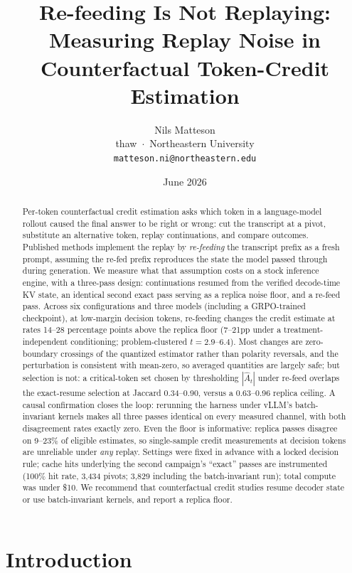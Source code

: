 \documentclass[11pt]{article}
\title{Re-feeding Is Not Replaying:\\
Measuring Replay Noise in\\
Counterfactual Token-Credit Estimation}
\author{
  Nils Matteson\\
  thaw \,$\cdot$\, Northeastern University\\
  \texttt{matteson.ni@northeastern.edu}
}
\date{June 2026}
\newcommand{\At}{\ensuremath{\hat{A}_t}\xspace}
\begin{document}
\maketitle

\begin{abstract}
Per-token counterfactual credit estimation asks which token in a language-model
rollout caused the final answer to be right or wrong: cut the transcript at a
pivot, substitute an alternative token, replay continuations, and compare
outcomes. Published methods implement the replay by \emph{re-feeding} the
transcript prefix as a fresh prompt, assuming the re-fed prefix reproduces the
state the model passed through during generation. We measure what that
assumption costs on a stock inference engine, with a three-pass design:
continuations resumed from the verified decode-time KV state, an identical
second exact pass serving as a replica noise floor, and a re-feed pass.
Across six configurations and three models (including a GRPO-trained
checkpoint), at low-margin decision tokens, re-feeding changes the credit
estimate at rates 14--28 percentage points above the replica floor
(7--21pp under a treatment-independent conditioning; problem-clustered
$t = 2.9$--$6.4$). Most changes are zero-boundary
crossings of the quantized estimator rather than polarity reversals, and the
perturbation is consistent with mean-zero, so averaged quantities are
largely safe; but
selection is not: a critical-token set chosen by thresholding $|\At|$ under
re-feed overlaps the exact-resume selection at Jaccard 0.34--0.90, versus a
0.63--0.96 replica ceiling. A causal confirmation closes the loop: rerunning
the harness under vLLM's batch-invariant kernels makes all three passes
identical on every measured channel, with both disagreement rates exactly
zero. Even the floor
is informative: replica passes disagree on 9--23\% of eligible estimates,
so single-sample credit measurements at decision tokens are unreliable under
\emph{any} replay. Settings were fixed in advance with a locked decision
rule; cache hits underlying the second campaign's ``exact'' passes are
instrumented (100\% hit
rate, 3{,}434 pivots; 3{,}829 including the batch-invariant run); total compute was under \$10. We recommend that
counterfactual credit studies resume decoder state or use batch-invariant
kernels, and report a replica floor.
\end{abstract}

\section{Introduction}
\end{document}
